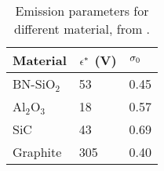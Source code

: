  \begin{table}[hbtp]
   \centering
   \caption{Emission parameters for different material, from \citet{barral2003a}.}
   \label{tab-seeparames}
   \begin{tabular}{@{}lll@{}} \toprule
   Material & $\epsilon^{*}$ (V)& $\sigma _0$ \\ \midrule
   BN-SiO$_2$ & 53 & 0.45 \\ 
   Al$_2$O$_3$ & 18  & 0.57 \\ 
   SiC     &  43  &0.69  \\
   Graphite & 305  & 0.40 \\ 
   \bottomrule
   \end{tabular}
 \end{table}
 
